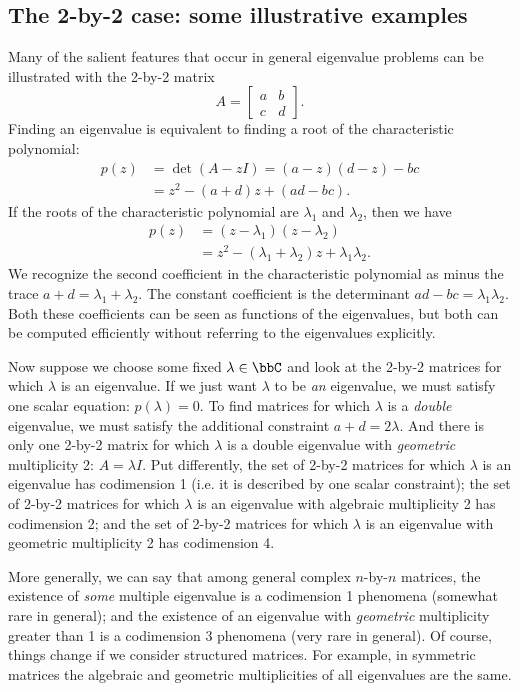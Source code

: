 \subsection{The 2-by-2 case: some illustrative examples}

Many of the salient features that occur in general eigenvalue
problems can be illustrated with the 2-by-2 matrix
\[
  A = \begin{bmatrix} a & b \\ c & d \end{bmatrix}.
\]
Finding an eigenvalue is equivalent to finding a root
of the characteristic polynomial:
\begin{align*}
  p(z)
    &= \det(A-z I) = (a-z)(d-z) - bc \\
    &= z^2 - (a + d) z + (ad-bc).
\end{align*}
If the roots of the characteristic polynomial are $\lambda_1$ and
$\lambda_2$, then we have
\begin{align*}
  p(z) &= (z-\lambda_1)(z-\lambda_2) \\
       &= z^2 - (\lambda_1 + \lambda_2) z + \lambda_1 \lambda_2.
\end{align*}
We recognize the second coefficient in the
characteristic polynomial as minus the trace $a + d = \lambda_1 +
\lambda_2$.  The constant coefficient is the determinant
$ad-bc = \lambda_1 \lambda_2$.  Both these coefficients can be
seen as functions of the eigenvalues, but both can be computed
efficiently without referring to the eigenvalues explicitly.

Now suppose we choose some fixed $\lambda \in \bbC$ and look at the
2-by-2 matrices for which $\lambda$ is an eigenvalue.  If we just want
$\lambda$ to be {\em an} eigenvalue, we must satisfy one scalar
equation: $p(\lambda) = 0$.  To find matrices for which $\lambda$ is a
{\em double} eigenvalue, we must satisfy the additional constraint
$a+d = 2\lambda$.  And there is only one 2-by-2 matrix for which $\lambda$ is
a double eigenvalue with {\em geometric} multiplicity 2: $A = \lambda I$.
Put differently, the set of 2-by-2 matrices for which $\lambda$ is an
eigenvalue has codimension 1 (i.e. it is described by one scalar
constraint); the set of 2-by-2 matrices for which $\lambda$ is an eigenvalue
with algebraic multiplicity 2 has codimension 2; and the set of 2-by-2
matrices for which $\lambda$ is an eigenvalue with geometric multiplicity
2 has codimension 4.

More generally, we can say that among general complex $n$-by-$n$ matrices,
the existence of {\em some} multiple eigenvalue is a
codimension 1 phenomena (somewhat rare in general); and the existence
of an eigenvalue with {\em geometric} multiplicity greater than 1 is
a codimension 3 phenomena (very rare in general).  Of course, things
change if we consider structured matrices.  For example, in symmetric
matrices the  algebraic and geometric multiplicities of all eigenvalues
are the same.

